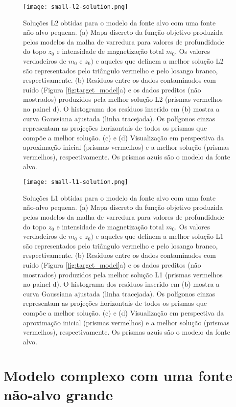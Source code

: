 \pagebreak
\begin{figure}[!htb]
	\centering
	\texttt{[image: small-l2-solution.png]}
	\caption{Soluções L2 obtidas para o modelo da fonte alvo com uma fonte não-alvo pequena. 
		(a) Mapa discreto da função objetivo produzida pelos modelos da malha de varredura para valores de profundidade do topo $z_{0}$ e intensidade de magnetização total $m_{0}$. 
		Os valores verdadeiros de $m_{0}$ e $z_{0})$ e aqueles que definem a melhor solução L2 são representados pelo triângulo vermelho e pelo losango branco, respectivamente.
		(b) Resíduos entre os dados contaminados com ruído (Figura \ref{fig:target_model}a) 
		e os dados preditos (não mostrados) produzidos pela melhor solução L2 (prismas vermelhos no painel d). 
		O histograma dos resíduos inserido em (b) mostra a curva Gaussiana ajustada (linha tracejada).
		Os polígonos cinzas representam as projeções horizontais de todos os prismas que compõe a melhor solução. 
		(c) e (d) Visualização em perspectiva da aproximação inicial (prismas vermelhos) e 
		a melhor solução (prismas vermelhos), respectivamente. Os prismas azuis são o modelo da fonte alvo.
	}
	\label{fig:small_l2_result}
\end{figure}
\pagebreak
\begin{figure}[!htb]
	\centering
	\texttt{[image: small-l1-solution.png]}
	\caption{Soluções L1 obtidas para o modelo da fonte alvo com uma fonte não-alvo pequena. 
		(a) Mapa discreto da função objetivo produzida pelos modelos da malha de varredura para valores de profundidade do topo $z_{0}$ e intensidade de magnetização total $m_{0}$. 
		Os valores verdadeiros de $m_{0}$ e $z_{0})$ e aqueles que definem a melhor solução L1 são representados pelo triângulo vermelho e pelo losango branco, respectivamente.
		(b) Resíduos entre os dados contaminados com ruído (Figura \ref{fig:target_model}a) 
		e os dados preditos (não mostrados) produzidos pela melhor solução L1 (prismas vermelhos no painel d). 
		O histograma dos resíduos inserido em (b) mostra a curva Gaussiana ajustada (linha tracejada).
		Os polígonos cinzas representam as projeções horizontais de todos os prismas que compõe a melhor solução. 
		(c) e (d) Visualização em perspectiva da aproximação inicial (prismas vermelhos) e 
		a melhor solução (prismas vermelhos), respectivamente. Os prismas azuis são o modelo da fonte alvo. 
	}
	\label{fig:small_l1_result}
\end{figure}
\pagebreak
\section{Modelo complexo com uma fonte não-alvo grande}
\label{sec:target_source_with_large_interference}

